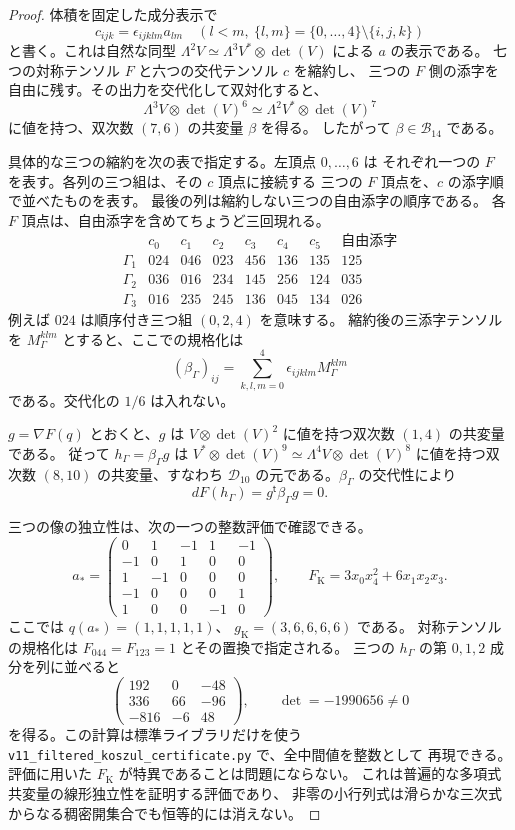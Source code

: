 \begin{proof}
体積を固定した成分表示で
\[
 c_{ijk}=\epsilon_{ijklm}a_{lm}\quad(l<m,\ \{l,m\}=\{0,\ldots,4\}
                                  \setminus\{i,j,k\})
\]
と書く。これは自然な同型
$\Lambda^2V\simeq\Lambda^3V^*\otimes\det(V)$ による $a$ の表示である。
七つの対称テンソル $F$ と六つの交代テンソル $c$ を縮約し、
三つの $F$ 側の添字を自由に残す。その出力を交代化して双対化すると、
\[
 \Lambda^3V\otimes\det(V)^6
       \simeq\Lambda^2V^*\otimes\det(V)^7
\]
に値を持つ、双次数 $(7,6)$ の共変量 $\beta$ を得る。
したがって $\beta\in\mathcal B_{14}$ である。

具体的な三つの縮約を次の表で指定する。左頂点 $0,\ldots,6$ は
それぞれ一つの $F$ を表す。各列の三つ組は、その $c$ 頂点に接続する
三つの $F$ 頂点を、$c$ の添字順で並べたものを表す。
最後の列は縮約しない三つの自由添字の順序である。
各 $F$ 頂点は、自由添字を含めてちょうど三回現れる。
\[
\begin{array}{c|cccccc|c}
 &c_0&c_1&c_2&c_3&c_4&c_5&\text{自由添字}\\\hline
 \Gamma_1&024&046&023&456&136&135&125\\
 \Gamma_2&036&016&234&145&256&124&035\\
 \Gamma_3&016&235&245&136&045&134&026
\end{array}
\]
例えば $024$ は順序付き三つ組 $(0,2,4)$ を意味する。
縮約後の三添字テンソルを $M_\Gamma^{klm}$ とすると、ここでの規格化は
\[
 (\beta_\Gamma)_{ij}
     =\sum_{k,l,m=0}^4\epsilon_{ijklm}M_\Gamma^{klm}
\]
である。交代化の $1/6$ は入れない。

$g=\nabla F(q)$ とおくと、$g$ は
$V\otimes\det(V)^2$ に値を持つ双次数 $(1,4)$ の共変量である。
従って $h_\Gamma=\beta_\Gamma g$ は
$V^*\otimes\det(V)^9\simeq\Lambda^4V\otimes\det(V)^8$
に値を持つ双次数 $(8,10)$ の共変量、すなわち
$\mathcal D_{10}$ の元である。$\beta_\Gamma$ の交代性により
\[
 dF(h_\Gamma)=g^{\mathsf t}\beta_\Gamma g=0.
\]

三つの像の独立性は、次の一つの整数評価で確認できる。
\[
 a_*=
 \begin{pmatrix}
 0&1&-1&1&-1\\
 -1&0&1&0&0\\
 1&-1&0&0&0\\
 -1&0&0&0&1\\
 1&0&0&-1&0
 \end{pmatrix},
 \qquad
 F_{\mathrm K}=3x_0x_4^2+6x_1x_2x_3.
\]
ここでは $q(a_*)=(1,1,1,1,1)$、
$g_{\mathrm K}=(3,6,6,6,6)$ である。
対称テンソルの規格化は $F_{044}=F_{123}=1$ とその置換で指定される。
三つの $h_{\Gamma}$ の第 $0,1,2$ 成分を列に並べると
\[
 \begin{pmatrix}
 192&0&-48\\
 336&66&-96\\
 -816&-6&48
 \end{pmatrix},
 \qquad
 \det=-1990656\ne0
\]
を得る。この計算は標準ライブラリだけを使う
\texttt{v11\_filtered\_koszul\_certificate.py} で、全中間値を整数として
再現できる。
評価に用いた $F_{\mathrm K}$ が特異であることは問題にならない。
これは普遍的な多項式共変量の線形独立性を証明する評価であり、
非零の小行列式は滑らかな三次式からなる稠密開集合でも恒等的には消えない。


\end{proof}
